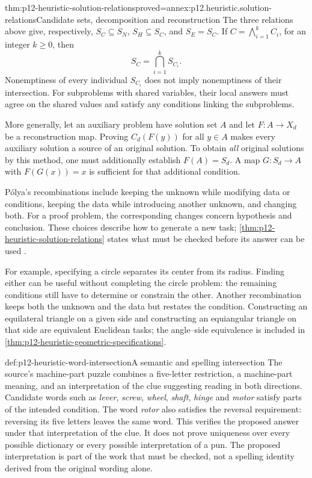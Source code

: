 \begin{hbtheorem}{thm:p12-heuristic-solution-relations}{proved=annex:p12.heuristic.solution-relations}{Candidate sets, decomposition and reconstruction}
The three relations above give, respectively,
\(S_C\subseteq S_N\), \(S_H\subseteq S_C\), and
\(S_E=S_C\). If \(C=\bigwedge_{i=1}^k C_i\), for an integer
\(k\ge0\), then
\[
                     S_C=\bigcap_{i=1}^k S_{C_i}.
\]
Nonemptiness of every individual \(S_{C_i}\) does not imply
nonemptiness of their intersection. For subproblems with shared
variables, their local answers must agree on the shared values and
satisfy any conditions linking the subproblems.

More generally, let an auxiliary problem have solution set \(A\)
and let \(F:A\to X_d\) be a reconstruction map. Proving
\(C_d(F(y))\) for all \(y\in A\) makes every auxiliary solution
a source of an original solution. To obtain \emph{all} original
solutions by this method, one must additionally establish
\(F(A)=S_d\). A map \(G:S_d\to A\) with \(F(G(x))=x\)
is sufficient for that additional condition.
\end{hbtheorem}

P\'olya's recombinations include keeping the unknown while modifying
data or conditions, keeping the data while introducing another unknown,
and changing both. For a proof problem, the corresponding changes concern
hypothesis and conclusion. These choices describe how to generate a
new task; \cref{thm:p12-heuristic-solution-relations} states what must
be checked before its answer can be used
\cite[Part~III, ``Decomposing and recombining'']{Polya2004HowToSolveItSelected}.

For example, specifying a circle separates its center from its radius.
Finding either can be useful without completing the circle problem:
the remaining conditions still have to determine or constrain the other.
Another recombination keeps both the unknown and the data but restates
the condition. Constructing an equilateral triangle on a given side
and constructing an equiangular triangle on that side are equivalent
Euclidean tasks; the angle--side equivalence is included in
\cref{thm:p12-heuristic-geometric-specifications}.

\begin{hbexample}{def:p12-heuristic-word-intersection}{A semantic and spelling intersection}
The source's machine-part puzzle combines a five-letter restriction,
a machine-part meaning, and an interpretation of the clue suggesting
reading in both directions. Candidate words such as \emph{lever},
\emph{screw}, \emph{wheel}, \emph{shaft}, \emph{hinge} and
\emph{motor} satisfy parts of the intended condition. The word
\emph{rotor} also satisfies the reversal requirement: reversing its
five letters leaves the same word. This verifies the proposed answer
under that interpretation of the clue. It does not prove uniqueness
over every possible dictionary or every possible interpretation of a pun.
The proposed interpretation is part of the work that must be checked,
not a spelling identity derived from the original wording alone.
\end{hbexample}

